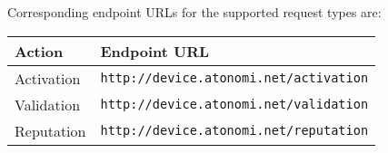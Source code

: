 Corresponding endpoint URLs for the supported request types are:

\begin{center}
\begin{tabular}{l l}
	\textbf{Action} & \textbf{Endpoint URL} \\
	\hline
	Activation & \texttt{http://device.atonomi.net/activation} \\
	Validation & \texttt{http://device.atonomi.net/validation} \\
	Reputation & \texttt{http://device.atonomi.net/reputation} \\
\end{tabular}
\end{center}


